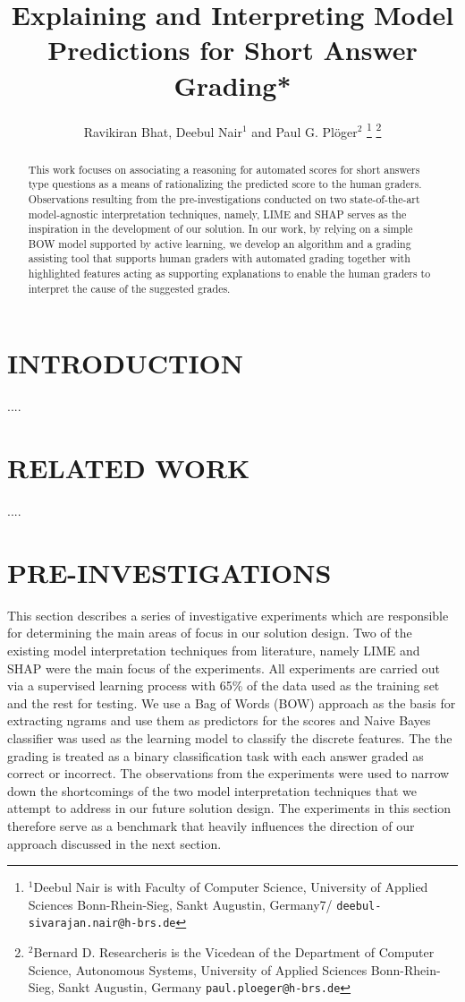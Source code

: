 \documentclass[letterpaper, 10 pt, conference]{ieeeconf}  %
\title{\LARGE \bf
Explaining and Interpreting Model Predictions for Short Answer Grading*
}
\author{Ravikiran Bhat, Deebul Nair$^{1}$ and Paul G. Pl{\"o}ger$^{2}$%
\thanks{$^{1}$Deebul Nair is with Faculty of Computer Science,
        University of Applied Sciences Bonn-Rhein-Sieg, Sankt Augustin, Germany7/
        {\tt\small deebul-sivarajan.nair@h-brs.de}}%
\thanks{$^{2}$Bernard D. Researcheris is the Vicedean of the Department of Computer Science, Autonomous Systems, University of Applied Sciences Bonn-Rhein-Sieg, Sankt Augustin, Germany
        {\tt\small paul.ploeger@h-brs.de}}%
}
\begin{document}
\maketitle
\thispagestyle{empty}
\pagestyle{empty}


\begin{abstract}

This work focuses on associating a reasoning for automated scores for short answers type questions as a means of rationalizing the predicted score to the human graders. Observations resulting from the pre-investigations conducted on two state-of-the-art model-agnostic interpretation techniques, namely, LIME and SHAP serves as the inspiration in the development of our solution. In our work, by relying on a simple BOW model supported by active learning, we develop an algorithm and a grading assisting tool that supports human graders with automated grading together with highlighted features acting as supporting explanations to enable the human graders to interpret the cause of the suggested grades. 

\end{abstract}


\section{INTRODUCTION}

....

\section{RELATED WORK}
....

\section{PRE-INVESTIGATIONS}

This section describes a series of investigative experiments which are responsible for determining the main areas of focus in our solution design. Two of the existing model interpretation techniques from literature, namely LIME and SHAP were the main focus of the experiments. All experiments are carried out via a supervised learning process with 65\% of the data used as the training set and the rest for testing. We use a Bag of Words (BOW) approach as the basis for extracting ngrams and use them as predictors for the scores and Naive Bayes classifier was used as the learning model to classify the discrete features. The the grading is treated as a binary classification task with each answer graded as correct or incorrect. The observations from the experiments were used to narrow down the shortcomings of the two model interpretation techniques that we attempt to address in our future solution design. The experiments in this section therefore serve as a benchmark that heavily influences the direction of our approach discussed in the next section.
\end{document}
